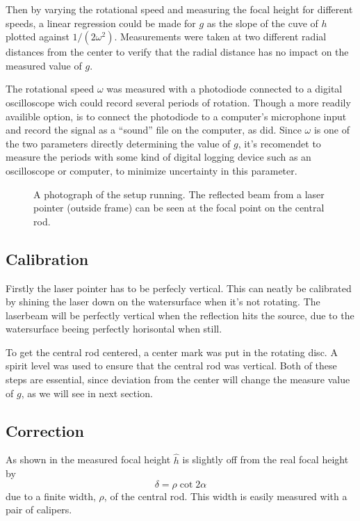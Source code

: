 \documentclass[11pt,towcolumn, swedish, english]{article}
\begin{document}
Then by varying the rotational speed and measuring the focal height for
different speeds, a linear regression could be made for $g$ as the
slope of the cuve of $h$ plotted against $1/(2\omega^2)$. 
Measurements were taken at two different radial distances from the
center to verify that the radial distance has no impact on the measured
value of $g$. 

The rotational speed $\omega$ was measured with a photodiode connected
to a digital oscilloscope wich could record several periods of
rotation. Though a more readily availible option, is to connect the
photodiode to a computer's microphone input and record the signal as a
``sound'' file on the computer, as \cite{Sabatka2010} did. Since
$\omega$ is one of the two parameters directly determining the value
of $g$, it's recomendet to measure the periods with some kind of
digital logging device such as an oscilloscope or computer, to
minimize uncertainty in this parameter.

\begin{figure}
\centering
\resizebox{0.7\linewidth}{!}{}
\caption{A photograph of the setup running. The
  reflected beam from a laser pointer (outside frame) can be seen at
  the focal point on the central rod. } 
\label{fig:rot_bowl_pic} 
\end{figure}

\subsection{Calibration}
Firstly the laser pointer has to be perfecly vertical. This can neatly be
calibrated by shining the laser down on the watersurface when it's not
rotating. The laserbeam will be perfectly vertical when the
reflection hits the source, due to the watersurface beeing perfectly
horisontal when still.

To get the central rod centered, a center mark was put in the rotating
disc. A spirit level was used to ensure that the central rod was
vertical. Both of these steps are essential, since deviation from the
center will change the measure value of $g$, as we will see in next
section. 


\subsection{Correction}\label{sec:corrections}
As shown in  the measured focal height
$\hat{h}$ is slightly off from the real focal height by 
\begin{equation}%
\delta=\rho\cot 2\alpha
\end{equation}
due to a finite width, $\rho$, of the central rod. This width is easily
measured with a pair of calipers.
\end{document}
